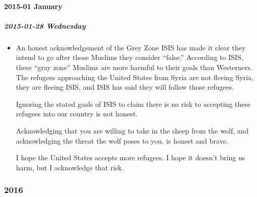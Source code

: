 \documentclass[11pt]{article}
\begin{document}
\paragraph*{2015-01 January}
\label{sec:orgcb93ca5}
\startcontents[level-4]
\subparagraph*{2015-01-28 Wednesday}
\label{sec:org169dc03}
\begin{itemize}
\item An honest acknowledgement of the Grey Zone
\label{sec:org8fc3cb1}
ISIS has made it clear they intend to go after those Muslims they consider “false.” According to ISIS, these “gray zone” Muslims are more harmful to their goals than Westerners. The refugees approaching the United States from Syria are not fleeing Syria, they are fleeing ISIS, and ISIS has said they will follow those refugees.

Ignoring the stated goals of ISIS to claim there is no risk to accepting these refugees into our country is not honest.

Acknowledging that you are willing to take in the sheep from the wolf, and acknowledging the threat the wolf poses to you, is honest and brave.

I hope the United States accepts more refugees. I hope it doesn’t bring us harm, but I acknowledge that risk.
\end{itemize}
\stopcontents[level-4]
\stopcontents[level-3]
\subsubsection*{2016}
\label{sec:org0db208a}
\startcontents[level-3]
\end{document}

